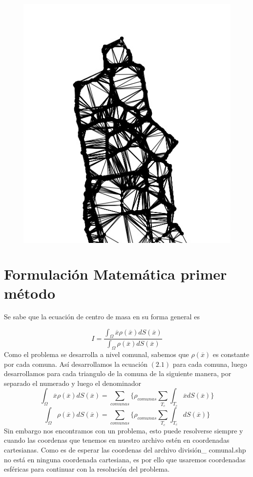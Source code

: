 \documentclass[20pt]{report}
\begin{document}
\begin{itemize}
\begin{figure}[H]
{    \includegraphics[scale=1]{chile2.jpg} 
    }
    \centering
\end{figure}

\label{cap.introduccion}\section{Formulaci\'on Matem\'atica primer m\'etodo}
Se sabe que la ecuaci\'on de centro de masa en su forma general es 

\begin{equation}
I=\dfrac{\int_{\Omega} \overline{x}\rho(\overline{x}) dS(\overline{x}) }{\int_{\Omega} \rho(\overline{x}) dS(\overline{x}) }
\end{equation}
Como el problema se desarrolla a nivel comunal,  sabemos que $\rho(\overline{x})$ es constante por cada comuna. As\'i  desarrollamos la ecuaci\'on $(2.1)$ para cada comuna, luego desarrollamos para cada triangulo de la comuna de la siguiente manera, por separado el numerado y luego el denominador
\begin{equation}
\int_{\Omega} \overline{x}\rho(\overline{x}) dS(\overline{x})=\sum_{comunas} \lbrace \rho_{comunas} \sum_{T_c} \int_{T_c} \overline{x} dS(\overline{x}) \rbrace 
\end{equation}
\begin{equation}
\int_{\Omega} \rho(\overline{x}) dS(\overline{x})=\sum_{comunas} \lbrace \rho_{comunas} \sum_{T_c} \int_{T_c}  dS(\overline{x}) \rbrace 
\end{equation}
Sin embargo nos encontramos con un problema, esto puede resolverse siempre y cuando las coordenas que tenemos en nuestro archivo est\'en en coordenadas cartesianas. Como es de esperar las coordenas del archivo divisi\'on\_ comunal.shp no est\'a en ninguna coordenada cartesiana, es por ello que  usaremos coordenadas esf\'ericas para continuar con la resoluci\'on del problema.\\


\end{itemize}
\end{document}
